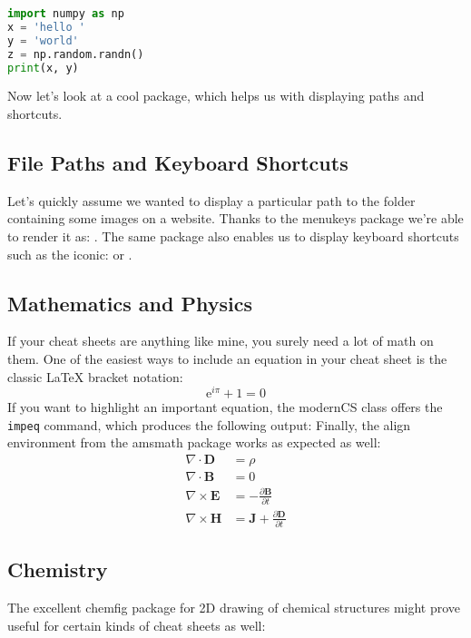 \documentclass{modernCS}
\begin{document}
\begin{lstlisting}[language=Python]
import numpy as np
x = 'hello '
y = 'world'
z = np.random.randn()
print(x, y)
\end{lstlisting}
Now let's look at a cool package, which helps us with displaying paths and shortcuts.
\subsection{File Paths and Keyboard Shortcuts}
Let's quickly assume we wanted to display a particular path to the folder containing some images on a website. Thanks to the menukeys package we're able to render it as: . The same package also enables us to display keyboard shortcuts such as the iconic: \keys{\ctrl + \Alt + \del} or .
\subsection{Mathematics and Physics}
If your cheat sheets are anything like mine, you surely need a lot of math on them. One of the easiest ways to include an equation in your cheat sheet is the classic \LaTeX{} bracket notation:
\[
\mathrm{e}^{i\pi} + 1 = 0
\]
If you want to highlight an important equation, the modernCS class offers the \texttt{impeq} command, which produces the following output:
Finally, the align environment from the amsmath package works as expected as well:
\begin{align*}
	\nabla \cdot \mathbf{D} &= \rho \\
	\nabla \cdot \mathbf{B} &= 0 \\
	\nabla \times \mathbf{E} &= -\frac{\partial \mathbf{B}} {\partial t} \\
	\nabla \times \mathbf{H} &= \mathbf{J} + \frac{\partial \mathbf{D}} {\partial t}
\end{align*}
\subsection{Chemistry}
The excellent chemfig package for 2D drawing of chemical structures might prove useful for certain kinds of cheat sheets as well:
\begin{center}
\end{center}
\end{document}
